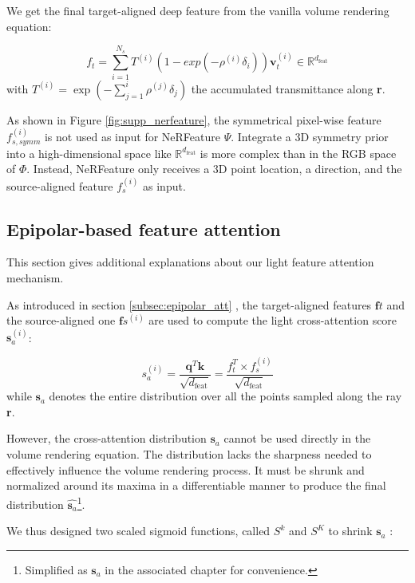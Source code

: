 We get the final target-aligned deep feature from the vanilla volume rendering equation:

\begin{equation}
\label{eq:ft_vr}
    f_{t} = \sum_{i=1}^{N_{s}} T^{(i)}(1-exp(-\rho^{(i)}\delta_{i}))\mathbf{v}_{t}^{(i)} \in \mathbb{R}^{d_{\text{feat}}}
\end{equation}
with $T^{(i)} = \exp\left(-\sum_{j=1}^{i}\rho^{(j)}\delta_{j}\right)$ the accumulated transmittance along \textbf{r}.

As shown in Figure \ref{fig:supp_nerfeature}, the symmetrical pixel-wise feature $f_{s,symm}^{(i)}$ is not used as input for NeRFeature $\Psi$. Integrate a 3D symmetry prior into a high-dimensional space like $\mathbb{R}^{d_{\text{feat}}}$ is more complex than in the RGB space of $\Phi$. Instead, NeRFeature only receives a 3D point location, a direction, and the source-aligned feature $f_{s}^{(i)}$ as input.

\subsection{Epipolar-based feature attention}
\label{appendix:epinerf-feature}
This section gives additional explanations about our light feature attention mechanism.

As introduced in section \ref{subsec:epipolar_att} , the target-aligned features $\mathbf{f}{t}$ and the source-aligned one $\mathbf{f}{s}^{(i)}$ are used to compute the light cross-attention score $\mathbf{s}_{a}^{(i)}$:

\begin{equation}
    s_{a}^{(i)} = \frac{\mathbf{q}^{T}\mathbf{k}}{\sqrt{d_{\text{feat}}}}= \frac{f_{t}^{T}\times f_{s}^{(i)}}{\sqrt{d_{\text{feat}}}}
\label{eq:attention}
\end{equation}
while $\mathbf{s}_{a}$ denotes the entire distribution over all the points sampled along the ray \textbf{r}.

However, the cross-attention distribution $\mathbf{s}_{a}$ cannot be used directly in the volume rendering equation. The distribution lacks the sharpness needed to effectively influence the volume rendering process. It must be shrunk and normalized around its maxima in a differentiable manner to produce the final distribution $\hat{\mathbf{s}_{a}}$\footnote{Simplified as $\mathbf{s}_{a}$ in the associated chapter for convenience.}.

We thus designed two scaled sigmoid functions, called $S^{k}$ and $S^{K}$ to shrink $\mathbf{s}_{a}$ : 

